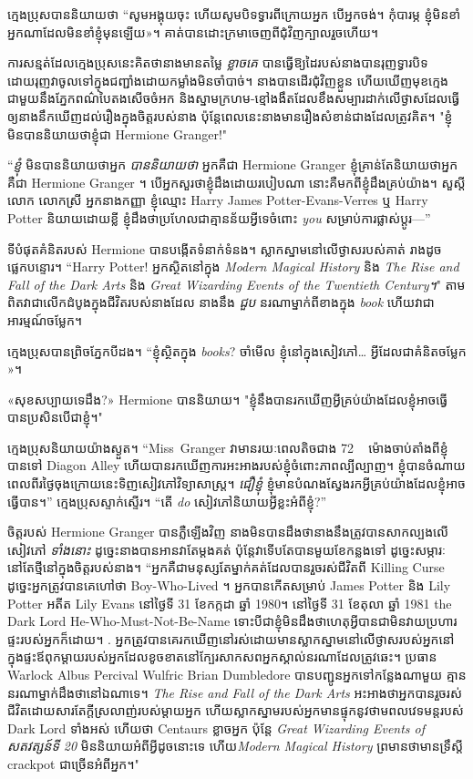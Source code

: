 ក្មេងប្រុសបាននិយាយថា “សូមអង្គុយចុះ ហើយសូមបិទទ្វារពីក្រោយអ្នក បើអ្នកចង់។ កុំ​បារម្ភ ខ្ញុំ​មិន​ខាំ​អ្នក​ណា​ដែល​មិន​ខាំ​ខ្ញុំ​មុន​ឡើយ»។ គាត់​បាន​ដោះ​ក្រមា​ចេញ​ពី​ជុំវិញ​ក្បាល​រួច​ហើយ។

ការសន្មត់ដែលក្មេងប្រុសនេះគិតថានាងមានតម្លៃ \emph{ខ្លាចគេ} បានធ្វើឱ្យដៃរបស់នាងបានរុញទ្វារបិទ ដោយរុញវាចូលទៅក្នុងជញ្ជាំងដោយកម្លាំងមិនចាំបាច់។ នាងបានដើរជុំវិញខ្លួន ហើយឃើញមុខក្មេងជាមួយនឹងភ្នែកពណ៌បៃតងសើចចំអក និងស្នាមក្រហម-ខ្មៅងងឹតដែលខឹងសម្បារដាក់លើថ្ងាសដែលធ្វើឲ្យនាងនឹកឃើញដល់រឿងក្នុងចិត្តរបស់នាង ប៉ុន្តែពេលនេះនាងមានរឿងសំខាន់ជាងដែលត្រូវគិត។ "ខ្ញុំមិនបាននិយាយថាខ្ញុំជា Hermione Granger!"

“\emph{ខ្ញុំ} មិនបាននិយាយថាអ្នក \emph{បាននិយាយថា} អ្នកគឺជា Hermione Granger ខ្ញុំគ្រាន់តែនិយាយថាអ្នកគឺជា Hermione Granger ។ បើ​អ្នក​សួរ​ថា​ខ្ញុំ​ដឹង​ដោយ​របៀប​ណា នោះ​គឺ​មក​ពី​ខ្ញុំ​ដឹង​គ្រប់​យ៉ាង។ សួស្តីលោក លោកស្រី អ្នកនាងកញ្ញា ខ្ញុំឈ្មោះ Harry James Potter-Evans-Verres ឬ Harry Potter និយាយដោយខ្លី ខ្ញុំដឹងថាប្រហែលជាគ្មានន័យអ្វីទេចំពោះ \emph{you} សម្រាប់ការផ្លាស់ប្តូរ—”

ទីបំផុតគំនិតរបស់ Hermione បានបង្កើតទំនាក់ទំនង។ ស្លាកស្នាមនៅលើថ្ងាសរបស់គាត់ រាងដូចផ្លេកបន្ទោរ។ “Harry Potter! អ្នកស្ថិតនៅក្នុង \emph{Modern Magical History} និង \emph{The Rise and Fall of the Dark Arts} និង \emph{Great Wizarding Events of the Twentieth Century។}" តាមពិតវាជាលើកដំបូងក្នុងជីវិតរបស់នាងដែល នាងនឹង \emph { ជួប } នរណាម្នាក់ពីខាងក្នុង \emph {book} ហើយវាជាអារម្មណ៍ចម្លែក។

ក្មេងប្រុសបានព្រិចភ្នែកបីដង។ “ខ្ញុំស្ថិតក្នុង \emph{books}? ចាំ​មើល ខ្ញុំ​នៅ​ក្នុង​សៀវភៅ​… អ្វី​ដែល​ជា​គំនិត​ចម្លែក​»។

«សុខសប្បាយទេដឹង?» Hermione បាននិយាយ។ "ខ្ញុំ​នឹង​បាន​រក​ឃើញ​អ្វី​គ្រប់​យ៉ាង​ដែល​ខ្ញុំ​អាច​ធ្វើ​បាន​ប្រសិន​បើ​ជា​ខ្ញុំ​។"

ក្មេងប្រុសនិយាយយ៉ាងស្ងួត។ “Miss~Granger វាមានរយៈពេលតិចជាង 72 ~ ម៉ោងចាប់តាំងពីខ្ញុំបានទៅ Diagon Alley ហើយបានរកឃើញការអះអាងរបស់ខ្ញុំចំពោះភាពល្បីល្បាញ។ ខ្ញុំបានចំណាយពេលពីរថ្ងៃចុងក្រោយនេះទិញសៀវភៅវិទ្យាសាស្ត្រ។ \emph{ជឿខ្ញុំ} ខ្ញុំមានបំណងស្វែងរកអ្វីគ្រប់យ៉ាងដែលខ្ញុំអាចធ្វើបាន។” ក្មេងប្រុសស្ទាក់ស្ទើរ។ “តើ \emph{do} សៀវភៅនិយាយអ្វីខ្លះអំពីខ្ញុំ?”

ចិត្តរបស់ Hermione Granger បានភ្លឺឡើងវិញ នាងមិនបានដឹងថានាងនឹងត្រូវបានសាកល្បងលើសៀវភៅ \emph{ទាំងនោះ} ដូច្នេះនាងបានអានវាតែម្តងគត់ ប៉ុន្តែវាទើបតែបានមួយខែកន្លងទៅ ដូច្នេះសម្ភារៈនៅតែថ្មីនៅក្នុងចិត្តរបស់នាង។ “អ្នកគឺជាមនុស្សតែម្នាក់គត់ដែលបានរួចរស់ជីវិតពី Killing Curse ដូច្នេះអ្នកត្រូវបានគេហៅថា Boy-Who-Lived ។ អ្នកបានកើតសម្រាប់ James Potter និង Lily Potter អតីត Lily Evans នៅថ្ងៃទី 31 ខែកក្កដា ឆ្នាំ 1980។ នៅថ្ងៃទី 31 ខែតុលា ឆ្នាំ 1981 the Dark Lord He-Who-Must-Not-Be-Name ទោះបីជាខ្ញុំមិនដឹងថាហេតុអ្វីបានជាមិនវាយប្រហារផ្ទះរបស់អ្នកក៏ដោយ។ . អ្នក​ត្រូវ​បាន​គេ​រក​ឃើញ​នៅ​រស់​ដោយ​មាន​ស្លាក​ស្នាម​នៅ​លើ​ថ្ងាស​របស់​អ្នក​នៅ​ក្នុង​ផ្ទះ​ឪពុក​ម្តាយ​របស់​អ្នក​ដែល​ខូច​ខាត​នៅ​ក្បែរ​សាកសព​អ្នក​ស្គាល់​នរណា​ដែល​ត្រូវ​ឆេះ។ ប្រធាន Warlock Albus Percival Wulfric Brian Dumbledore បានបញ្ជូនអ្នកទៅកន្លែងណាមួយ គ្មាននរណាម្នាក់ដឹងថានៅឯណាទេ។ \emph{The Rise and Fall of the Dark Arts} អះអាងថាអ្នកបានរួចរស់ជីវិតដោយសារតែក្តីស្រលាញ់របស់ម្តាយអ្នក ហើយស្លាកស្នាមរបស់អ្នកមានផ្ទុកនូវថាមពលវេទមន្តរបស់ Dark Lord ទាំងអស់ ហើយថា Centaurs ខ្លាចអ្នក ប៉ុន្តែ \emph{Great Wizarding Events of សតវត្សន៍ទី 20} មិននិយាយអំពីអ្វីដូចនោះទេ ហើយ\emph{Modern Magical History} ព្រមានថាមានទ្រឹស្ដី crackpot ជាច្រើនអំពីអ្នក។"

